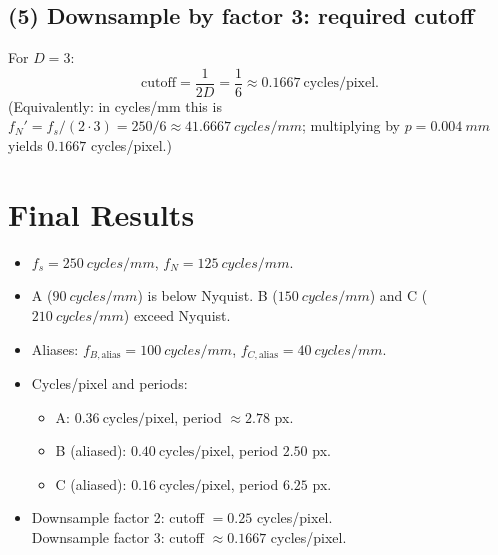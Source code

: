 \documentclass[12pt,a4paper]{article}
\begin{document}
\subsection*{(5) Downsample by factor 3: required cutoff}

For \(D=3\):
\[
\text{cutoff}=\frac{1}{2D}=\frac{1}{6}\approx\boxed{0.1667\ \text{cycles/pixel}}.
\]
(Equivalently: in cycles/mm this is \(f_N' = f_s/(2\cdot 3)=250/6\approx\SI{41.6667}{cycles/mm}\); multiplying by \(p=\SI{0.004}{mm}\) yields \(0.1667\) cycles/pixel.)

\bigskip
\section*{Final Results}
\begin{itemize}
  \item \(f_s=\SI{250}{cycles/mm}\), \(f_N=\SI{125}{cycles/mm}\).
  \item A (\(\SI{90}{cycles/mm}\)) is below Nyquist. B (\(\SI{150}{cycles/mm}\)) and C (\(\SI{210}{cycles/mm}\)) exceed Nyquist.
  \item Aliases: \(f_{B,\text{alias}}=\SI{100}{cycles/mm}\), \(f_{C,\text{alias}}=\SI{40}{cycles/mm}\).
  \item Cycles/pixel and periods:
    \begin{itemize}
      \item A: \(0.36\ \text{cycles/pixel}\), period \(\approx 2.78\) px.
      \item B (aliased): \(0.40\ \text{cycles/pixel}\), period \(2.50\) px.
      \item C (aliased): \(0.16\ \text{cycles/pixel}\), period \(6.25\) px.
    \end{itemize}
  \item Downsample factor 2: cutoff \(=0.25\) cycles/pixel. \\
        Downsample factor 3: cutoff \(\approx 0.1667\) cycles/pixel.
\end{itemize}
\end{document}
